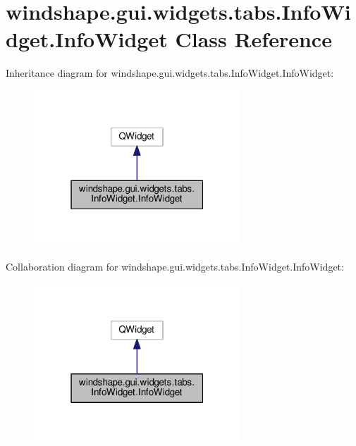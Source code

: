 \hypertarget{classwindshape_1_1gui_1_1widgets_1_1tabs_1_1_info_widget_1_1_info_widget}{}\section{windshape.\+gui.\+widgets.\+tabs.\+Info\+Widget.\+Info\+Widget Class Reference}
\label{classwindshape_1_1gui_1_1widgets_1_1tabs_1_1_info_widget_1_1_info_widget}


Inheritance diagram for windshape.\+gui.\+widgets.\+tabs.\+Info\+Widget.\+Info\+Widget\+:\nopagebreak
\begin{figure}[H]
\begin{center}
\leavevmode
\includegraphics[width=220pt]{classwindshape_1_1gui_1_1widgets_1_1tabs_1_1_info_widget_1_1_info_widget__inherit__graph}
\end{center}
\end{figure}


Collaboration diagram for windshape.\+gui.\+widgets.\+tabs.\+Info\+Widget.\+Info\+Widget\+:\nopagebreak
\begin{figure}[H]
\begin{center}
\leavevmode
\includegraphics[width=220pt]{classwindshape_1_1gui_1_1widgets_1_1tabs_1_1_info_widget_1_1_info_widget__coll__graph}
\end{center}
\end{figure}
